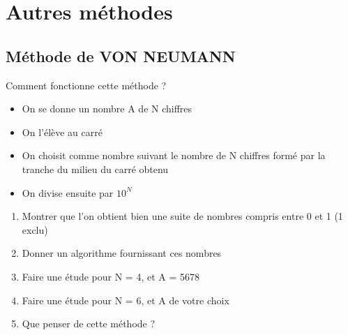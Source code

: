 \documentclass{book}
\begin{document}
\section{Autres méthodes}
\subsection{Méthode de VON NEUMANN}
Comment fonctionne cette méthode ?
\begin{itemize}
	\item On se donne un nombre A de N chiffres
	\item On l'élève au carré
	\item On choisit comme nombre suivant le nombre de N chiffres formé par la tranche du milieu du carré obtenu
	\item On divise ensuite par $10^N$
\end{itemize}
\begin{enumerate}
	\item Montrer que l'on obtient bien une suite de nombres compris entre 0 et 1 (1 exclu)
	\item Donner un algorithme fournissant ces nombres
	\item Faire une étude pour N = 4, et A = 5678
	\item Faire une étude pour N = 6, et A de votre choix
	\item Que penser de cette méthode ?
\end{enumerate}
\end{document}

